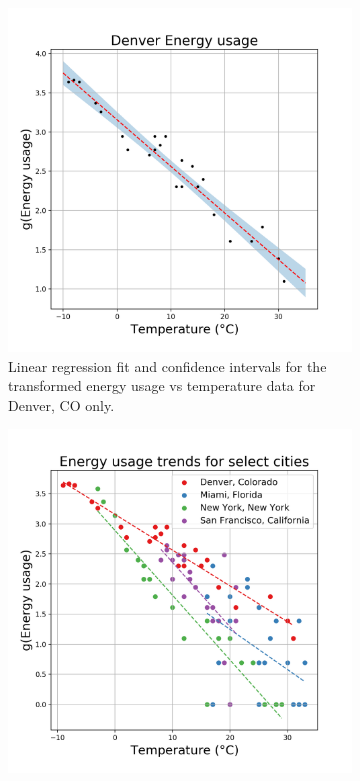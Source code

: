 \documentclass[11pt]{article}
\begin{document}
\begin{figure}[ht] \centering
  \begin{subfigure}{0.32\textwidth}
    \includegraphics[width=\textwidth]{denver_fit.png}
    \caption{Linear regression fit and confidence intervals for the transformed energy usage vs temperature data for Denver, CO only.}
    \label{fig:denver_fit}
  \end{subfigure}%
  \hfill
  \begin{subfigure}{0.32\textwidth}
    \includegraphics[width=\textwidth]{select_cities.png}

\end{subfigure}
\end{figure}
\end{document}
